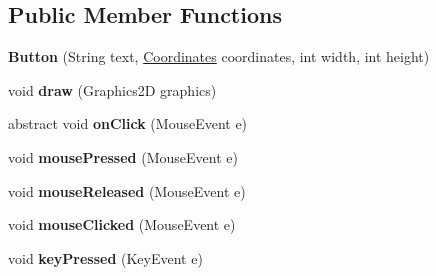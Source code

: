 \subsection*{Public Member Functions}
\begin{DoxyCompactItemize}
\item 
\mbox{\label{classde_1_1me_1_1edgelord_1_1sjgl_1_1ui_1_1_button_a0543ffe4d0723c8aaea197b17cd33b53}} 
{\bfseries Button} (String text, \mbox{\hyperlink{classde_1_1me_1_1edgelord_1_1sjgl_1_1location_1_1_coordinates}{Coordinates}} coordinates, int width, int height)
\item 
\mbox{\label{classde_1_1me_1_1edgelord_1_1sjgl_1_1ui_1_1_button_a3e16d23a59281ff24cc07e315df27769}} 
void {\bfseries draw} (Graphics2D graphics)
\item 
\mbox{\label{classde_1_1me_1_1edgelord_1_1sjgl_1_1ui_1_1_button_ab42a8e5caa8b0ca6f30ddc849a8566d3}} 
abstract void {\bfseries on\+Click} (Mouse\+Event e)
\item 
\mbox{\label{classde_1_1me_1_1edgelord_1_1sjgl_1_1ui_1_1_button_a356c758991d249653a3be73b12213b96}} 
void {\bfseries mouse\+Pressed} (Mouse\+Event e)
\item 
\mbox{\label{classde_1_1me_1_1edgelord_1_1sjgl_1_1ui_1_1_button_a5eb957ea8af31e52090f09a5a5a4e5b9}} 
void {\bfseries mouse\+Released} (Mouse\+Event e)
\item 
\mbox{\label{classde_1_1me_1_1edgelord_1_1sjgl_1_1ui_1_1_button_ac2bf4890b709bfc7d3537b100d64cfb0}} 
void {\bfseries mouse\+Clicked} (Mouse\+Event e)
\item 
\mbox{\label{classde_1_1me_1_1edgelord_1_1sjgl_1_1ui_1_1_button_a1fb97afb19dd489ecfe38635d3d5aed5}} 
void {\bfseries key\+Pressed} (Key\+Event e)
\item 
\mbox{\label{classde_1_1me_1_1edgelord_1_1sjgl_1_1ui_1_1_button_afdbe2a3762366bd34839b199fe33a825}} 

\end{DoxyCompactItemize}
